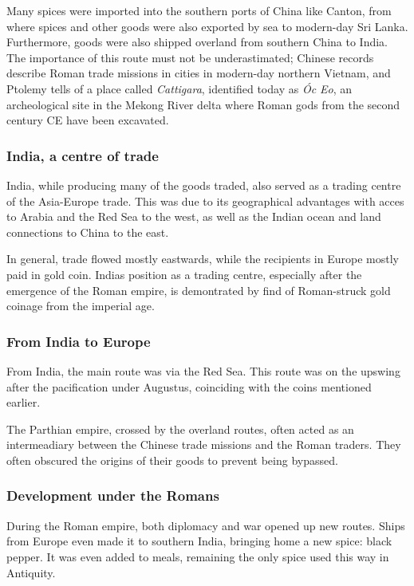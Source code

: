 \documentclass[11pt, a4paper, headings=standardclasses]{scrartcl}
\begin{document}
Many spices were imported into the southern ports of China like Canton, from where spices and other goods were also exported by sea to modern-day Sri Lanka. Furthermore, goods were also shipped overland from southern China to India.\autocite[Maps 4 and 5]{Rome} The importance of this route must not be underastimated; Chinese records describe Roman trade missions in cities in modern-day northern Vietnam\autocite{curtin_1984}, and Ptolemy tells of a place called \emph{Cattigara}, identified today as \emph{\'{O}c Eo}, an archeological site in the Mekong River delta where Roman gods from the second century CE have been excavated.\autocite{OcEo}

\subsubsection{India, a centre of trade}
India, while producing many of the goods traded, also served as a trading centre of the Asia-Europe trade. This was due to its geographical advantages with acces to Arabia and the Red Sea to the west, as well as the Indian ocean and land connections to China to the east.

In general, trade flowed mostly eastwards, while the recipients in Europe mostly paid in gold coin. Indias position as a trading centre, especially after the emergence of the Roman empire, is demontrated by find of Roman-struck gold coinage from the imperial age.\autocite[100]{curtin_1984}

\subsubsection{From India to Europe}

From India, the main route was via the Red Sea. This route was on the upswing after the pacification under Augustus, coinciding with the coins mentioned earlier.\autocite[Chapter 7]{Rome}

The Parthian empire, crossed by the overland routes, often acted as an intermeadiary between the Chinese trade missions and the Roman traders. They often obscured the origins of their goods to prevent being bypassed.\autocite{SilkRome}

\subsubsection{Development under the Romans}

During the Roman empire, both diplomacy and war opened up new routes. Ships from Europe even made it to southern India, bringing home a new spice: black pepper. It was even added to meals, remaining the only spice used this way in Antiquity.\autocite{RIS}
\end{document}
